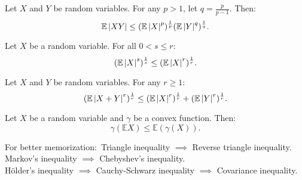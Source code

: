 \documentclass{huhtakm-template-book-v2}
\newcommand{\expect}{\mathbb{E}}
\begin{document}
    \begin{thm}
        Let $X$ and $Y$ be random variables. For any $p > 1$, let $q = \frac{p}{p-1}$. Then:
        \begin{equation*}
            \expect\abs{XY} \leq (\expect\abs{X}^{p})^{\frac{1}{p}}(\expect\abs{Y}^{q})^{\frac{1}{q}}.
        \end{equation*}
    \end{thm}
    \begin{thm}
        Let $X$ be a random variable. For all $0 < s \leq r$:
        \begin{equation*}
            (\expect\abs{X}^{s})^{\frac{1}{s}} \leq (\expect\abs{X}^{r})^{\frac{1}{r}}.
        \end{equation*}
    \end{thm}
    \begin{thm}
        Let $X$ and $Y$ be random variables. For any $r \geq 1$:
        \begin{equation*}
            (\expect\abs{X+Y}^{r})^{\frac{1}{r}} \leq (\expect\abs{X}^{r})^{\frac{1}{r}}+(\expect\abs{Y}^{r})^{\frac{1}{r}}.
        \end{equation*}
    \end{thm}
    \begin{thm}
        Let $X$ be a random variable and $\gamma$ be a convex function. Then:
        \begin{equation*}
            \gamma(\expect{X}) \leq \expect(\gamma(X)).
        \end{equation*}
    \end{thm}
    For better memorization:\
    Triangle inequality $\implies$ Reverse triangle inequality.\\
    Markov's inequality $\implies$ Chebyshev's inequality.\\
    H\"older's inequality $\implies$ Cauchy-Schwarz inequality $\implies$ Covariance inequality.

\end{document}

